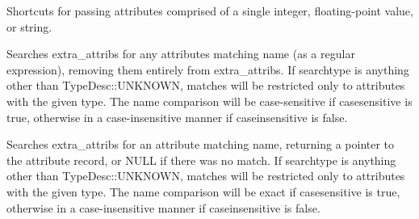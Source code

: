 Shortcuts for passing attributes comprised of a single integer,
floating-point value, or string.
\apiend


Searches {\cf extra_attribs} for any attributes matching {\cf name} (as
a regular expression), removing them entirely from {\cf extra_attribs}.
If {\cf searchtype} is anything other than {\cf TypeDesc::UNKNOWN},
matches will be restricted only to attributes with the given type.
The name comparison will be case-sensitive if {\cf casesensitive} is true, otherwise
in a case-insensitive manner if {\cf caseinsensitive} is false.
\apiend


Searches {\cf extra_attribs} for an attribute matching {\cf name},
returning a pointer to the attribute record, or NULL if there was no
match.  If {\cf searchtype} is anything other than {\cf TypeDesc::UNKNOWN},
matches will be restricted only to attributes with the given type.
The name comparison will be exact if {\cf casesensitive} is true, otherwise
in a case-insensitive manner if {\cf caseinsensitive} is false.
\apiend

